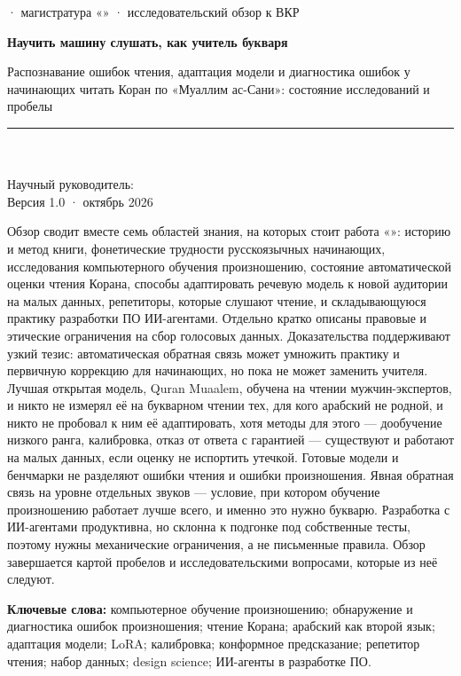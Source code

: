 \documentclass[a4paper,14pt]{extarticle}
\begin{document}
\thispagestyle{plain}
\begin{center}
{\headfamily\small\color{textmuted}\thesisUniversityRu{} · магистратура «\thesisSpecialtyRu» · исследовательский обзор к ВКР}\\[10pt]
{\headfamily\LARGE\bfseries\color{textaccent}Научить машину слушать, как учитель букваря\par}
\vspace{4pt}
{\headfamily\large\color{textaccent}Распознавание ошибок чтения, адаптация модели и диагностика ошибок у начинающих читать Коран по «Муаллим ас-Сани»: состояние исследований и пробелы\par}
\vspace{10pt}
{\color{textrule}\rule{0.35\linewidth}{1pt}}\\[8pt]
{\large \thesisAuthorRu}\\[2pt]
{\small Научный руководитель: \thesisSupervisorRu}\\[2pt]
{\small\color{textmuted} Версия 1.0 · октябрь 2026}
\end{center}

\begin{keybox}[Аннотация]
Обзор сводит вместе семь областей знания, на которых стоит работа «\thesisTopicRu»: историю и
метод книги, фонетические трудности русскоязычных начинающих, исследования компьютерного обучения
произношению, состояние автоматической оценки чтения Корана, способы адаптировать речевую модель к новой
аудитории на малых данных, репетиторы, которые слушают чтение, и
складывающуюся практику разработки ПО ИИ-агентами. Отдельно кратко описаны правовые и этические ограничения на сбор
голосовых данных. Доказательства поддерживают узкий тезис: автоматическая обратная связь может умножить
практику и первичную коррекцию для начинающих, но пока не может заменить учителя. Лучшая открытая
модель, Quran Muaalem, обучена на чтении мужчин-экспертов, и никто не измерял её на букварном чтении
тех, для кого арабский не родной, и никто не пробовал к ним её адаптировать, хотя методы для этого
--- дообучение низкого ранга, калибровка, отказ от ответа с гарантией --- существуют и работают на
малых данных, если оценку не испортить утечкой. Готовые модели и бенчмарки не разделяют ошибки чтения и ошибки произношения. Явная обратная связь на уровне отдельных звуков --- условие, при
котором обучение произношению работает лучше всего, и именно это нужно букварю. Разработка с ИИ-агентами
продуктивна, но склонна к подгонке под собственные тесты, поэтому нужны механические ограничения, а не
письменные правила. Обзор завершается картой пробелов и исследовательскими вопросами, которые из неё
следуют.

\smallskip
\textbf{Ключевые слова:} компьютерное обучение произношению; обнаружение и диагностика ошибок
произношения; чтение Корана; арабский как второй язык; адаптация модели; LoRA; калибровка;
конформное предсказание; репетитор чтения; набор данных; design science; ИИ-агенты в
разработке ПО.
\end{keybox}
\end{document}
